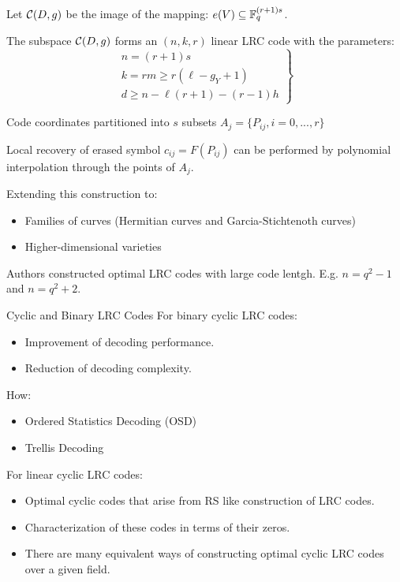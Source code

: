 \begin{frame}
    Let $\mathcal{C}(D,g)$ be the image of the mapping: $e(V) \subseteq \mathbb{F}_q^{(r+1)s}$.
    \begin{theorem}
        The subspace $\mathcal{C}(D,g)$ forms an $(n,k,r)$ linear LRC code with the parameters:
        $$        
        \left.                
        \begin{matrix}
        n = (r+1)s \\
        k = rm \geq r(\ell - g_Y + 1) \\
        d \geq n - \ell ( r+1) - (r-1)h
        \end{matrix}                
        \right\rbrace
        $$
    \end{theorem}
    Code coordinates partitioned into $s$ subsets $A_j = \{P_{ij}, i = 0, ..., r\}$
    
    Local recovery of erased symbol $c_{ij} = F(P_{ij})$ can be performed by polynomial interpolation through the points of $A_j$.
\end{frame}

\begin{frame}
    Extending this construction to:
    \begin{itemize}
    \item Families of curves (Hermitian curves and Garcia-Stichtenoth curves)
    \item Higher-dimensional varieties
    \end{itemize}
    Authors constructed optimal LRC codes with large code lentgh. E.g. $n=q^2-1$ and $n=q^2+2$.
\end{frame}

\begin{frame}{Cyclic and Binary LRC Codes}
For binary cyclic LRC codes:
\begin{itemize}
\item Improvement of decoding performance.
\item Reduction of decoding complexity.
\end{itemize}
How:
\begin{itemize}
\item Ordered Statistics Decoding (OSD)
\item Trellis Decoding
\end{itemize}

For linear cyclic LRC codes:

\begin{itemize}
\item Optimal cyclic codes that arise from RS like construction of LRC codes.
\item Characterization of these codes in terms of their zeros.
\item There are many equivalent ways of constructing optimal cyclic LRC codes over a given field.
\end{itemize}

\end{frame}

